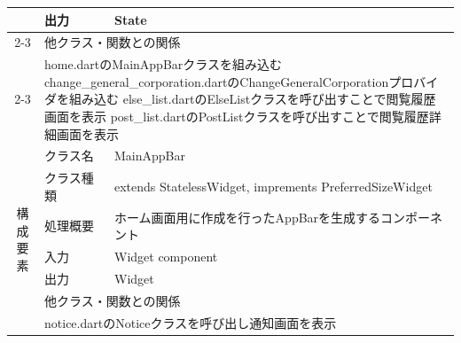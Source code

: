 \begin{table}[H]
{\begin{tabular}{|c|l|l|}
                            & 出力                                                                                  & State                                                      \\ \cline{2-3}
                            & \multicolumn{2}{l|}{他クラス・関数との関係}                                                                                                                 \\ \cline{2-3}
                            & \multicolumn{2}{p{14cm}|}{
        home.dartのMainAppBarクラスを組み込む
        \newline change\_general\_corporation.dartのChangeGeneralCorporationプロバイダを組み込む
        \newline else\_list.dartのElseListクラスを呼び出すことで閲覧履歴画面を表示
      \newline post\_list.dartのPostListクラスを呼び出すことで閲覧履歴詳細画面を表示}                                                                                                                 \\ \hline
      \multirow{7}{*}{構成要素} & クラス名                                                                                & MainAppBar                                                 \\ \cline{2-3}
                            & クラス種類                                                                               & extends StatelessWidget, imprements PreferredSizeWidget    \\ \cline{2-3}
                            & 処理概要                                                                                & \multicolumn{1}{p{12cm}|}{ホーム画面用に作成を行ったAppBarを生成するコンポーネント} \\ \cline{2-3}
                            & 入力                                                                                  & Widget component                                           \\ \cline{2-3}
                            & 出力                                                                                  & Widget                                                     \\ \cline{2-3}
                            & \multicolumn{2}{l|}{他クラス・関数との関係}                                                                                                                 \\ \cline{2-3}
                            & \multicolumn{2}{p{14cm}|}{notice.dartのNoticeクラスを呼び出し通知画面を表示}                                                                                     \\ \hline

\end{tabular}}
\end{table}
